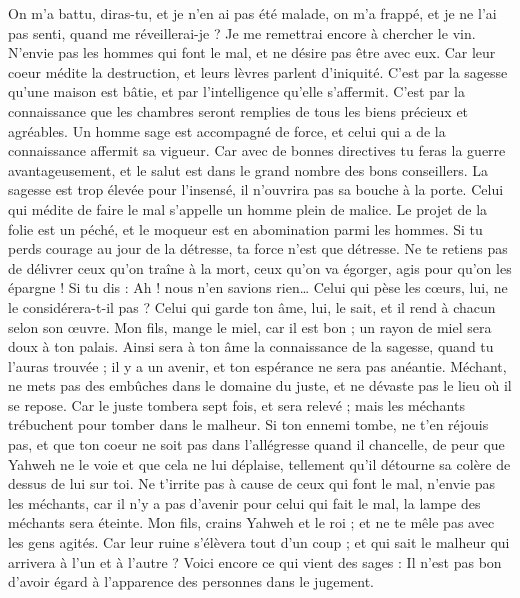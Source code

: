 \begin{multicols}{2}
On m'a battu, diras-tu, et je n'en ai pas été malade, on m'a frappé, et je ne l'ai pas senti, quand me réveillerai-je ? Je me remettrai encore à chercher le vin.
\VerseOne{}N'envie pas les hommes qui font le mal, et ne désire pas être avec eux.
Car leur coeur médite la destruction, et leurs lèvres parlent d'iniquité.
C'est par la sagesse qu'une maison est bâtie, et par l'intelligence qu'elle s'affermit.
C'est par la connaissance que les chambres seront remplies de tous les biens précieux et agréables.
Un homme sage est accompagné de force, et celui qui a de la connaissance affermit sa vigueur.
Car avec de bonnes directives tu feras la guerre avantageusement, et le salut est dans le grand nombre des bons conseillers.
La sagesse est trop élevée pour l'insensé, il n'ouvrira pas sa bouche à la porte.
Celui qui médite de faire le mal s'appelle un homme plein de malice.
Le projet de la folie est un péché, et le moqueur est en abomination parmi les hommes.
Si tu perds courage au jour de la détresse, ta force n'est que détresse.
Ne te retiens pas de délivrer ceux qu'on traîne à la mort, ceux qu'on va égorger, agis pour qu'on les épargne !
Si tu dis : Ah ! nous n'en savions rien… Celui qui pèse les cœurs, lui, ne le considérera-t-il pas ? Celui qui garde ton âme, lui, le sait, et il rend à chacun selon son œuvre.
Mon fils, mange le miel, car il est bon ; un rayon de miel sera doux à ton palais.
Ainsi sera à ton âme la connaissance de la sagesse, quand tu l'auras trouvée ; il y a un avenir, et ton espérance ne sera pas anéantie.
Méchant, ne mets pas des embûches dans le domaine du juste, et ne dévaste pas le lieu où il se repose.
Car le juste tombera sept fois, et sera relevé ; mais les méchants trébuchent pour tomber dans le malheur.
Si ton ennemi tombe, ne t'en réjouis pas, et que ton coeur ne soit pas dans l'allégresse quand il chancelle,
de peur que Yahweh ne le voie et que cela ne lui déplaise, tellement qu'il détourne sa colère de dessus de lui sur toi.
Ne t'irrite pas à cause de ceux qui font le mal, n'envie pas les méchants,
car il n'y a pas d'avenir pour celui qui fait le mal, la lampe des méchants sera éteinte.
Mon fils, crains Yahweh et le roi ; et ne te mêle pas avec les gens agités.
Car leur ruine s'élèvera tout d'un coup ; et qui sait le malheur qui arrivera à l'un et à l'autre ?
Voici encore ce qui vient des sages : Il n'est pas bon d'avoir égard à l'apparence des personnes dans le jugement.

\end{multicols}
